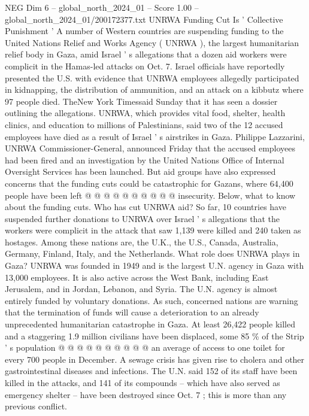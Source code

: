 \begin{textsample}{NEG Dim 6 – global\_north\_2024\_01 – Score 1.00 – global\_north\_2024\_01/200172377.txt}  \label{ex:f6_neg_335}
UNRWA Funding Cut Is ' Collective Punishment ' A number of Western countries are suspending funding to the United Nations Relief and Works Agency ( UNRWA ), the largest humanitarian relief body in Gaza, amid Israel ' s allegations that a dozen aid workers were complicit in the Hamas-led attacks on Oct. 7.
Israel officials have reportedly presented the U.S. with evidence that UNRWA employees allegedly participated in kidnapping, the distribution of ammunition, and an attack on a kibbutz where 97 people died.
TheNew York Timessaid Sunday that it has seen a dossier outlining the allegations.
UNRWA, which provides vital food, shelter, health clinics, and education to millions of Palestinians, said two of the 12 accused employees have died as a result of Israel ' s airstrikes in Gaza.
Philippe Lazzarini, UNRWA Commissioner-General, announced Friday that the accused employees had been fired and an investigation by the United Nations Office of Internal Oversight Services has been launched.
But aid groups have also expressed concerns that the funding cuts could be catastrophic for Gazans, where 64,400 people have been left @ @ @ @ @ @ @ @ @ @ insecurity.
Below, what to know about the funding cuts.
Who has cut UNRWA aid?
So far, 10 countries have suspended further donations to UNRWA over Israel ' s allegations that the workers were complicit in the attack that saw 1,139 were killed and 240 taken as hostages.
Among these nations are, the U.K., the U.S., Canada, Australia, Germany, Finland, Italy, and the Netherlands.
What role does UNRWA plays in Gaza?
UNRWA was founded in 1949 and is the largest U.N. agency in Gaza with 13,000 employees.
It is also active across the West Bank, including East Jerusalem, and in Jordan, Lebanon, and Syria.
The U.N. agency is almost entirely funded by voluntary donations.
As such, concerned nations are warning that the termination of funds will cause a deterioration to an already unprecedented humanitarian catastrophe in Gaza.
At least 26,422 people killed and a staggering 1.9 million civilians have been displaced, some 85 \% of the Strip ' s population @ @ @ @ @ @ @ @ @ @ an average of access to one toilet for every 700 people in December.
A sewage crisis has given rise to cholera and other gastrointestinal diseases and infections.
The U.N. said 152 of its staff have been killed in the attacks, and 141 of its compounds -- which have also served as emergency shelter -- have been destroyed since Oct. 7 ; this is more than any previous conflict.

\end{textsample}

